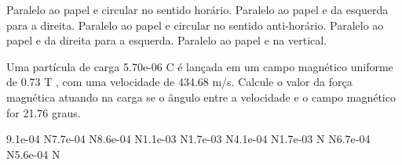 \documentclass[12pt, addpoints]{exam}
\begin{document}
\begin{questions}
\begin{multicols*}{2}
\begin{choices}
\choice Paralelo ao papel e circular no sentido horário. 
\choice Paralelo ao papel e da esquerda para a direita. 
\choice Paralelo ao papel e circular no sentido anti-horário. 
\choice Paralelo ao papel e da direita para a esquerda. 
\choice Paralelo ao papel e na vertical. 
\end{choices}
\question Uma partícula de carga 5.70e-06 C é lançada em um campo magnético uniforme de    0.73 T , com uma velocidade de 434.68 m/s. Calcule o valor da força magnética atuando na carga se o ângulo entre a velocidade e o campo magnético for   21.76 graus.

\begin{oneparchoices}
\choice 9.1e-04 N\choice 7.7e-04 N\choice 8.6e-04 N\choice 1.1e-03 N\choice 1.7e-03 N\choice 4.1e-04 N\choice 1.7e-03 N N\choice 6.7e-04 N\choice 5.6e-04 N
\end{oneparchoices}\end{multicols*}
\end{questions}
\newpage
\end{document}
